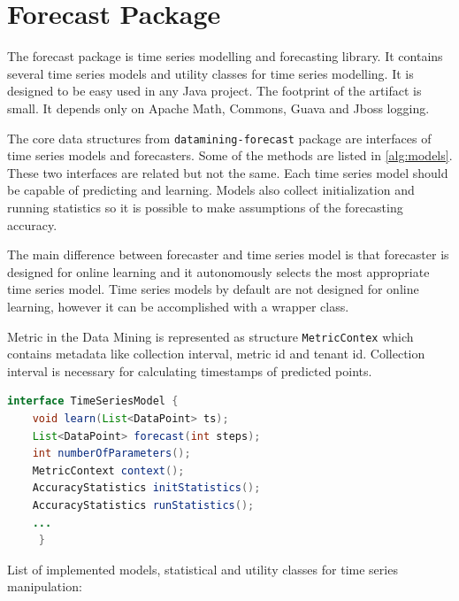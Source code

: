     \section{Forecast Package}
    The forecast package is time series modelling and forecasting library. It contains several time series models
    and utility classes for time series modelling. It is designed to be easy used in any Java project. The footprint
    of the artifact is small. It depends only on Apache Math, Commons, Guava and Jboss logging.

    The core data structures from \texttt{datamining-forecast} package are interfaces of time series models
    and forecasters. Some of the methods are listed in \ref{alg:models}. These two interfaces are related but not the
    same. Each time series model should be capable of predicting and learning. Models also collect initialization and
    running statistics so it is possible to make assumptions of the forecasting accuracy.

    The main difference between forecaster and time series model is that forecaster is designed for online learning
    and it autonomously selects the most appropriate time series model. Time series models by default are not
    designed for online learning, however it can be accomplished with a wrapper class.

    Metric in the Data Mining is represented as structure \texttt{MetricContex} which contains metadata like
    collection interval, metric id and tenant id. Collection interval is necessary for calculating timestamps of
    predicted points.

    \begin{lstlisting}[caption={Interface for time series models.}, language=Java, label={alg:models}]
interface TimeSeriesModel {
    void learn(List<DataPoint> ts);
    List<DataPoint> forecast(int steps);
    int numberOfParameters();
    MetricContext context();
    AccuracyStatistics initStatistics();
    AccuracyStatistics runStatistics();
    ...
     }
    \end{lstlisting}

    List of implemented models, statistical and utility classes for time series manipulation:

